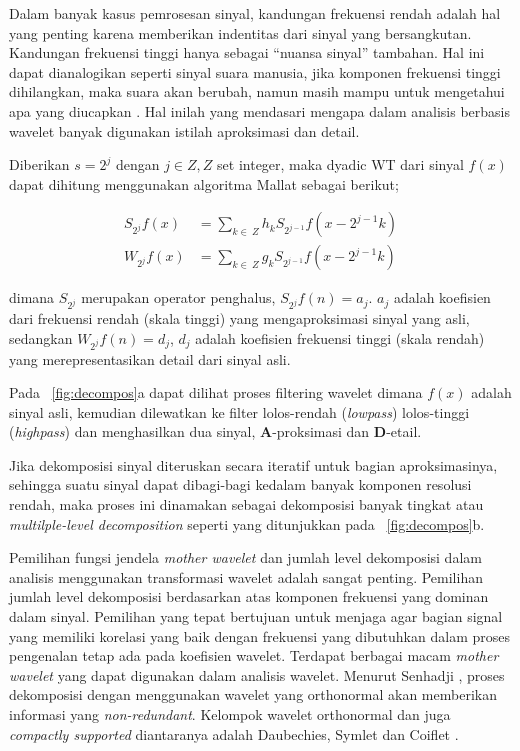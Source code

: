 Dalam banyak kasus pemrosesan sinyal, kandungan frekuensi rendah adalah hal yang
penting karena memberikan indentitas dari sinyal yang bersangkutan. Kandungan
frekuensi tinggi hanya sebagai ``nuansa sinyal'' tambahan. Hal ini dapat
dianalogikan seperti sinyal suara manusia, jika komponen frekuensi tinggi
dihilangkan, maka suara akan berubah, namun masih mampu untuk mengetahui apa
yang diucapkan \cite{wavelet:matlab}. Hal inilah yang mendasari mengapa dalam
analisis berbasis wavelet banyak digunakan istilah aproksimasi dan detail.

Diberikan $s = 2^j$ dengan $j \in Z, Z$ set integer, maka dyadic WT dari sinyal
$f(x)$  dapat dihitung menggunakan algoritma Mallat sebagai berikut;

\begin{align}
	\label{eq:sfn}
	S_{2^{j}}f(x) &= \sum_{k \in~Z} h_{k}S_{2^{j-1}}f(x - 2^{j-1}k) \\
	\label{eq:wfn}
	W_{2^{j}}f(x) &= \sum_{k \in~Z} g_{k}S_{2^{j-1}}f(x - 2^{j-1}k)
\end{align}

\noindent dimana $S_{2^{j}}$ merupakan operator penghalus, $S_{2^{j}} f(n) =
a_{j}$. $a_{j}$  adalah koefisien dari frekuensi rendah (skala tinggi) yang
mengaproksimasi sinyal yang asli, sedangkan $W_{2^{j}} f(n) = d_{j}$, $d_{j}$ 
adalah koefisien frekuensi tinggi (skala rendah) yang merepresentasikan detail
dari sinyal asli.


Pada \pic~\ref{fig:decompos}a dapat dilihat proses filtering wavelet dimana
$f(x)$ adalah sinyal asli, kemudian dilewatkan ke filter lolos-rendah
(\emph{lowpass})  lolos-tinggi (\emph{highpass}) dan menghasilkan dua sinyal,
\textbf{A}-proksimasi dan \textbf{D}-etail. 

Jika dekomposisi sinyal diteruskan secara iteratif untuk bagian aproksimasinya,
sehingga suatu sinyal dapat dibagi-bagi kedalam banyak komponen resolusi rendah,
maka proses ini dinamakan sebagai dekomposisi banyak tingkat atau
\emph{multilple-level decomposition} seperti yang ditunjukkan pada
\pic~\ref{fig:decompos}b.
 
Pemilihan fungsi jendela \emph{mother wavelet} dan jumlah level dekomposisi
dalam analisis menggunakan transformasi wavelet adalah sangat penting.
Pemilihan jumlah level dekomposisi berdasarkan atas komponen frekuensi
yang dominan dalam sinyal. Pemilihan yang tepat bertujuan untuk menjaga agar
bagian signal yang memiliki korelasi yang baik dengan frekuensi yang dibutuhkan
dalam proses pengenalan tetap ada pada koefisien wavelet. Terdapat berbagai
macam \emph{mother wavelet} yang dapat digunakan dalam analisis wavelet. Menurut
Senhadji \cite{Senhadji:1995}, proses dekomposisi dengan menggunakan wavelet
yang orthonormal akan memberikan informasi yang \emph{non-redundant}. Kelompok
wavelet orthonormal dan juga \emph{compactly supported} diantaranya adalah
Daubechies, Symlet dan Coiflet \cite{Agfi:2006}.


